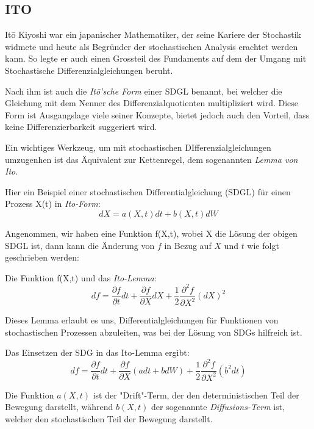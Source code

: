 \subsection{ITO\label{brown:ito}}

Itō Kiyoshi war ein japanischer Mathematiker, der seine Kariere der Stochastik widmete und heute als Begründer der stochastischen Analysis erachtet werden kann. So legte er auch einen Grossteil des Fundaments auf dem der Umgang mit Stochastische Differenzialgleichungen beruht. 

Nach ihm ist auch die \textit{Itō'sche Form} einer SDGL benannt, bei welcher die Gleichung mit dem Nenner des Differenzialquotienten multipliziert wird. Diese Form ist Ausgangslage viele seiner Konzepte, bietet jedoch auch den Vorteil, dass keine Differenzierbarkeit suggeriert wird.

Ein wichtiges Werkzeug, um mit stochastischen DIfferenzialgleichungen umzugenhen ist das Äquivalent zur Kettenregel, dem sogenannten \textit{Lemma von Ito}. %


Hier ein Beispiel einer stochastischen Differentialgleichung (SDGL) für einen Prozess X(t) in \textit{Ito-Form}:
\begin{equation}
	dX = a(X,t) dt + b(X,t) dW
\end{equation}


Angenommen, wir haben eine Funktion f(X,t), wobei X die Lösung der obigen SDGL ist, dann kann die Änderung von $ f $ in Bezug auf $ X $ und $ t $ wie folgt geschrieben werden:

Die Funktion f(X,t) und das \textit{Ito-Lemma}:
\begin{equation}
	df = \frac{\partial f}{\partial t} dt + \frac{\partial f}{\partial X} dX + \frac{1}{2} \frac{\partial^2 f}{\partial X^2} (dX)^2	
\end{equation}

Dieses Lemma erlaubt es uns, Differentialgleichungen für Funktionen von stochastischen Prozessen abzuleiten, was bei der Lösung von SDGs hilfreich ist.


Das Einsetzen der SDG in das Ito-Lemma ergibt:
\begin{equation}
	df = \frac{\partial f}{\partial t} dt + \frac{\partial f}{\partial X} (a dt + b dW) + \frac{1}{2} \frac{\partial^2 f}{\partial X^2} (b^2 dt)
\end{equation}

Die Funktion $ a(X,t) $ ist der "Drift"-Term, der den deterministischen Teil der Bewegung darstellt, während $ b(X,t) $ der sogenannte \textit{Diffusions-Term} ist, welcher den stochastischen Teil der Bewegung darstellt.


